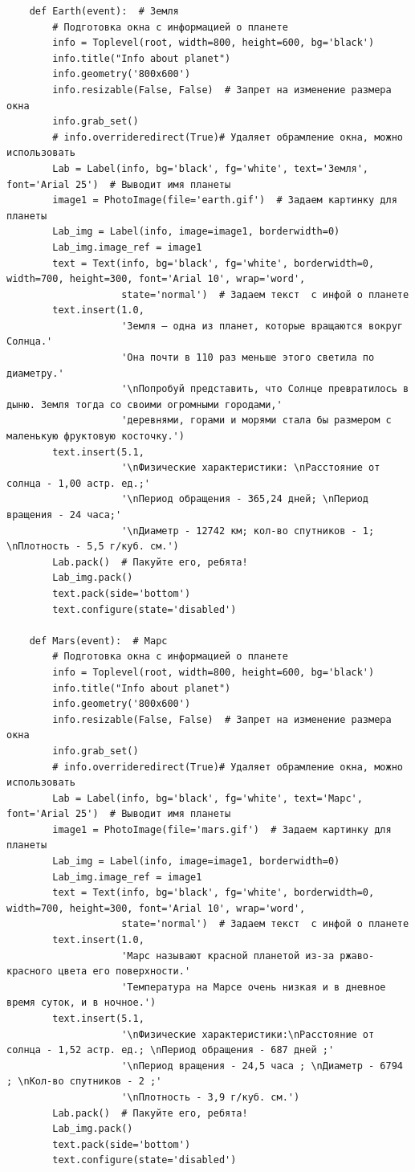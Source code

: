 \documentclass[11pt,a4paper]{report}
\begin{document}
\begin{verbatim}
    def Earth(event):  # Земля
        # Подготовка окна с информацией о планете
        info = Toplevel(root, width=800, height=600, bg='black')
        info.title("Info about planet")
        info.geometry('800x600')
        info.resizable(False, False)  # Запрет на изменение размера окна
        info.grab_set()
        # info.overrideredirect(True)# Удаляет обрамление окна, можно использовать
        Lab = Label(info, bg='black', fg='white', text='Земля', font='Arial 25')  # Выводит имя планеты
        image1 = PhotoImage(file='earth.gif')  # Задаем картинку для планеты
        Lab_img = Label(info, image=image1, borderwidth=0)
        Lab_img.image_ref = image1
        text = Text(info, bg='black', fg='white', borderwidth=0, width=700, height=300, font='Arial 10', wrap='word',
                    state='normal')  # Задаем текст  с инфой о планете
        text.insert(1.0,
                    'Земля — одна из планет, которые вращаются вокруг Солнца.'
                    'Она почти в 110 раз меньше этого светила по диаметру.'
                    '\nПопробуй представить, что Солнце превратилось в дыню. Земля тогда со своими огромными городами,'
                    'деревнями, горами и морями стала бы размером с маленькую фруктовую косточку.')
        text.insert(5.1,
                    '\nФизические характеристики: \nРасстояние от солнца - 1,00 астр. ед.;'
                    '\nПериод обращения - 365,24 дней; \nПериод вращения - 24 часа;'
                    '\nДиаметр - 12742 км; кол-во спутников - 1; \nПлотность - 5,5 г/куб. см.')
        Lab.pack()  # Пакуйте его, ребята!
        Lab_img.pack()
        text.pack(side='bottom')
        text.configure(state='disabled')

    def Mars(event):  # Марс
        # Подготовка окна с информацией о планете
        info = Toplevel(root, width=800, height=600, bg='black')
        info.title("Info about planet")
        info.geometry('800x600')
        info.resizable(False, False)  # Запрет на изменение размера окна
        info.grab_set()
        # info.overrideredirect(True)# Удаляет обрамление окна, можно использовать
        Lab = Label(info, bg='black', fg='white', text='Марс', font='Arial 25')  # Выводит имя планеты
        image1 = PhotoImage(file='mars.gif')  # Задаем картинку для планеты
        Lab_img = Label(info, image=image1, borderwidth=0)
        Lab_img.image_ref = image1
        text = Text(info, bg='black', fg='white', borderwidth=0, width=700, height=300, font='Arial 10', wrap='word',
                    state='normal')  # Задаем текст  с инфой о планете
        text.insert(1.0,
                    'Марс называют красной планетой из-за ржаво-красного цвета его поверхности.'
                    'Температура на Марсе очень низкая и в дневное время суток, и в ночное.')
        text.insert(5.1,
                    '\nФизические характеристики:\nРасстояние от солнца - 1,52 астр. ед.; \nПериод обращения - 687 дней ;'
                    '\nПериод вращения - 24,5 часа ; \nДиаметр - 6794 ; \nКол-во спутников - 2 ;'
                    '\nПлотность - 3,9 г/куб. см.')
        Lab.pack()  # Пакуйте его, ребята!
        Lab_img.pack()
        text.pack(side='bottom')
        text.configure(state='disabled')


\end{verbatim}
\end{document}
